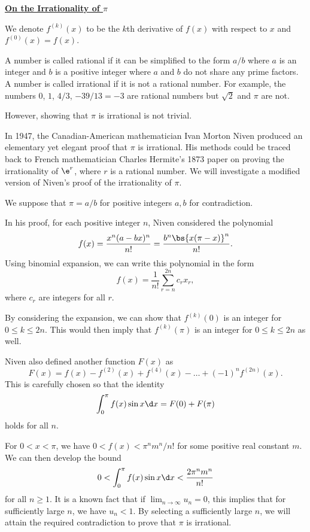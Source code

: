 \begin{problem}
    \begin{center}
        \textbf{\underline{On the Irrationality of $\pi$}}
    \end{center}
    We denote $f^{(k)}(x)$ to be the $k$th derivative of $f(x)$ with respect to $x$ and $f^{(0)}(x) = f(x)$.

    A number is called rational if it can be simplified to the form $a/b$ where $a$ is an integer and $b$ is a positive integer where $a$ and $b$ do not share any prime factors. A number is called irrational if it is not a rational number. For example, the numbers $0$, $1$, $4/3$, $-39/13 = -3$ are rational numbers but $\sqrt2$ and $\pi$ are not.

    However, showing that $\pi$ is irrational is not trivial.

    In 1947, the Canadian-American mathematician Ivan Morton Niven produced an elementary yet elegant proof that $\pi$ is irrational. His methods could be traced back to French mathematician Charles Hermite's 1873 paper on proving the irrationality of $\e^r$, where $r$ is a rational number. We will investigate a modified version of Niven's proof of the irrationality of $\pi$.

    We suppose that $\pi = a/b$ for positive integers $a, b$ for contradiction.

    In his proof, for each positive integer $n$, Niven considered the polynomial \[f(x) = \frac{x^n (a-bx)^n}{n!} = \frac{b^n \bs{x(\pi-x)}^n}{n!}.\] Using binomial expansion, we can write this polynomial in the form \[f(x) = \frac1{n!} \sum_{r = n}^{2n} c_r x_r,\] where $c_r$ are integers for all $r$.

    By considering the expansion, we can show that $f^{(k)}(0)$ is an integer for $0 \leq k \leq 2n$. This would then imply that $f^{(k)}(\pi)$ is an integer for $0 \leq k \leq 2n$ as well.

    Niven also defined another function $F(x)$ as \[F(x) = f(x) - f^{(2)}(x) + f^{(4)}(x) - \dots + (-1)^{n} f^{(2n)}(x).\] This is carefully chosen so that the identity \[\int_0^\pi f(x) \sin x \d x = F(0) + F(\pi)\] holds for all $n$.

    For $0 < x < \pi$, we have $0 < f(x) < \pi^n m^n / n!$ for some positive real constant $m$. We can then develop the bound \[0 < \int_{0}^{\pi} f(x) \sin x \d x < \frac{2\pi^n m^n}{n!}\] for all $n \geq 1$. It is a known fact that if $\lim_{n \to \infty} u_n = 0$, this implies that for sufficiently large $n$, we have $u_n < 1$. By selecting a sufficiently large $n$, we will attain the required contradiction to prove that $\pi$ is irrational.


\end{problem}
